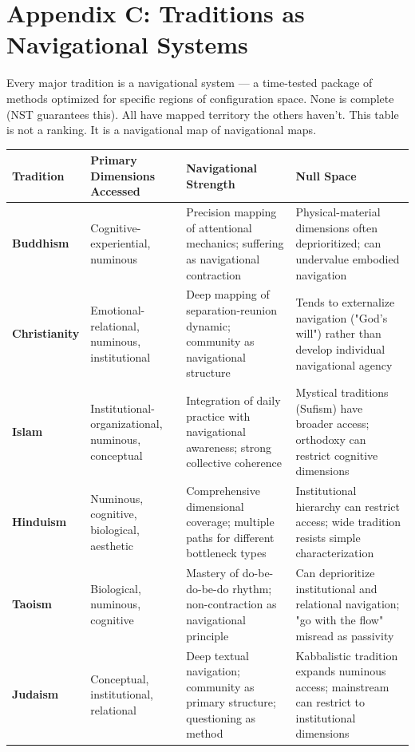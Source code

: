 \bigskip\noindent\makebox[\textwidth]{\color{rulegray}\rule{5cm}{0.3pt}}\bigskip


\section*{Appendix C: Traditions as Navigational Systems}


Every major tradition is a navigational system — a time-tested package of methods optimized for specific regions of configuration space. None is complete (NST guarantees this). All have mapped territory the others haven't. This table is not a ranking. It is a navigational map of navigational maps.



\begin{longtable}{p{} p{} p{} p{}}
\toprule
\textbf{Tradition} & \textbf{Primary Dimensions Accessed} & \textbf{Navigational Strength} & \textbf{Null Space} \\
\midrule
\endhead
\textbf{Buddhism} & Cognitive-experiential, numinous & Precision mapping of attentional mechanics; suffering as navigational contraction & Physical-material dimensions often deprioritized; can undervalue embodied navigation \\
\textbf{Christianity} & Emotional-relational, numinous, institutional & Deep mapping of separation-reunion dynamic; community as navigational structure & Tends to externalize navigation ("God's will") rather than develop individual navigational agency \\
\textbf{Islam} & Institutional-organizational, numinous, conceptual & Integration of daily practice with navigational awareness; strong collective coherence & Mystical traditions (Sufism) have broader access; orthodoxy can restrict cognitive dimensions \\
\textbf{Hinduism} & Numinous, cognitive, biological, aesthetic & Comprehensive dimensional coverage; multiple paths for different bottleneck types & Institutional hierarchy can restrict access; wide tradition resists simple characterization \\
\textbf{Taoism} & Biological, numinous, cognitive & Mastery of do-be-do-be-do rhythm; non-contraction as navigational principle & Can deprioritize institutional and relational navigation; "go with the flow" misread as passivity \\
\textbf{Judaism} & Conceptual, institutional, relational & Deep textual navigation; community as primary structure; questioning as method & Kabbalistic tradition expands numinous access; mainstream can restrict to institutional dimensions \\

\end{longtable}
